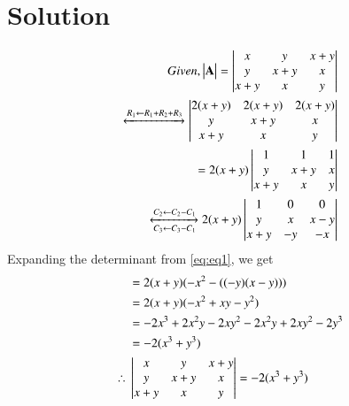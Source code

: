 \documentclass[journal,12pt,twocolumn]{IEEEtran}
\begin{document}
\section{Solution}
\begin{align}
	Given, \begin{vmatrix}\mathbf{A}\end{vmatrix} = \begin{vmatrix}x & y & x+y\\ y & x+y & x\\ x+y & x &y\end{vmatrix}\\
	\xleftrightarrow{ R_1 \leftarrow R_1 + R_2 + R_3} \begin{vmatrix}2(x + y) & 2(x + y) & 2(x + y)\\ y & x+y & x\\ x+y & x &y\end{vmatrix}\\
	= 2(x + y)\begin{vmatrix}1 & 1 & 1\\ y & x+y & x\\ x+y & x &y\end{vmatrix}\\
	\xleftrightarrow[C_3 \leftarrow C_3 - C_1]{C_2 \leftarrow C_2 - C_1}
	2(x + y) \begin{vmatrix}1 & 0 & 0\\ y & x & x-y\\ x+y & -y &-x\end{vmatrix}\label{eq:eq1}
\end{align}
Expanding the determinant from \eqref{eq:eq1}, we get
\begin{align}
     &= 2(x + y)(-x^2 - ((-y)(x-y))) \\
     &= 2(x + y)(-x^2 + xy - y^2)\\
     &= -2x^3 + 2x^2y - 2xy^2 - 2x^2y + 2xy^2 - 2y^3\\
     &= -2(x^3 + y^3)\\
     \therefore{}&\begin{vmatrix}x & y & x+y\\ y & x+y & x\\ x+y & x &y\end{vmatrix} = -2(x^3 + y^3)
\end{align}
\end{document}
